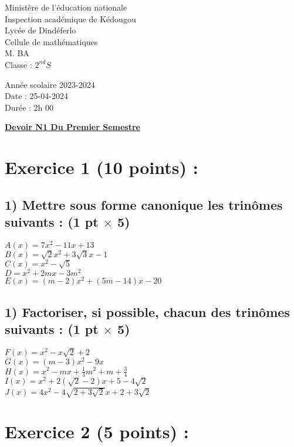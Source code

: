 \documentclass{article}
\begin{document}
\begin{minipage}{0.5\textwidth}
	Ministère de l'éducation nationale  \\
	Inspection académique de Kédougou   \\
	Lycée de Dindéferlo            \\
	Cellule de mathématiques            \\
	M. BA                          \\
	Classe : $2^{nd}S$  \\
\end{minipage}
\begin{minipage}{0.5\textwidth}
	Année scolaire 2023-2024 \\
	Date : 25-04-2024 \\
	Durée : 2h 00 \\
\end{minipage}

\begin{center}
	\textbf{{\underline{Devoir N1 Du Premier Semestre}}}
\end{center}

\section*{Exercice 1 (10 points) :}
\subsection*{1) Mettre sous forme canonique les trinômes suivants : (1 pt $\times$ 5)}
$A(x) = 7x^{2}-11x + 13$\\
$B(x) =\sqrt{2}x^{2}+3\sqrt{3}x-1$\\
$C(x) =x^{2}-\sqrt{5}$\\
$D =x^{2} + 2mx-3m^{2}$\\
$E(x) =(m-2)x^{2}+(5m-14)x-20$
\subsection*{1) Factoriser, si possible, chacun des trinômes suivants : (1 pt $\times$ 5)}
$F(x) =x^{2}-x\sqrt{2}+2$\\
$G(x)=(m-3)x^{2}-9x$\\ 
$H(x)=x^{2}-mx +\frac{1}{4}m^{2}+m+\frac{3}{4}$\\ 
$I(x)= x^{2} + 2(\sqrt{2}-2)x+5-4\sqrt{2}$\\ 
$J(x)=4x^{2}-4\sqrt{2+3\sqrt{2}}x+2+3\sqrt{2}$\\
\section*{Exercice 2 (5 points) :}
\end{document}
